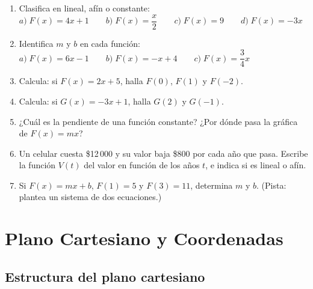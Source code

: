 \documentclass[12pt, letterpaper]{article}
\begin{document}
\begin{enumerate}[leftmargin=*]
  \item \facil{} Clasifica en lineal, afín o constante: $a) \; F(x) = 4x + 1 \qquad b) \; F(x) = \dfrac{x}{2} \qquad c) \; F(x) = 9 \qquad d) \; F(x) = -3x$

  \item \facil{} Identifica $m$ y $b$ en cada función: $a) \; F(x) = 6x - 1 \qquad b) \; F(x) = -x + 4 \qquad c) \; F(x) = \dfrac{3}{4}x$

  \item \facil{} Calcula: si $F(x) = 2x + 5$, halla $F(0)$, $F(1)$ y $F(-2)$.

  \item \facil{} Calcula: si $G(x) = -3x + 1$, halla $G(2)$ y $G(-1)$.

  \item \medio{} ¿Cuál es la pendiente de una función constante? ¿Por dónde pasa la gráfica de $F(x) = mx$?

  \item \medio{} Un celular cuesta \$12\,000 y su valor baja \$800 por cada año que pasa. Escribe la función $V(t)$ del valor en función de los años $t$, e indica si es lineal o afín.

  \item \dificil{} Si $F(x) = mx + b$, $F(1) = 5$ y $F(3) = 11$, determina $m$ y $b$. (Pista: plantea un sistema de dos ecuaciones.)
\end{enumerate}


\section{Plano Cartesiano y Coordenadas}

\subsection{Estructura del plano cartesiano}
\end{document}
